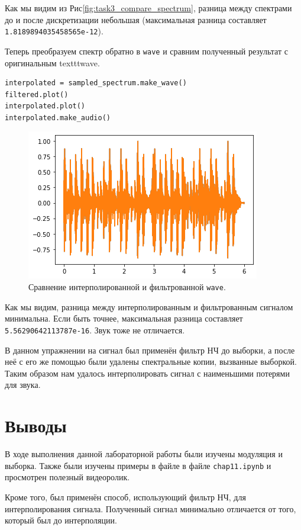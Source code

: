 \documentclass[a4paper, 14pt]{extarticle}
\begin{document}
    Как мы видим из Рис\ref{fig:task3_compare_spectrum}, разница между спектрами до и после дискретизации небольшая
    (максимальная разница составляет \texttt{1.8189894035458565e-12}).

    Теперь преобразуем спектр обратно в \texttt{wave} и сравним полученный результат с оригинальным texttt{wave}.

    \begin{lstlisting}[caption= Сравнение \texttt{wave}., label={lst:task3_compare_wave}]
interpolated = sampled_spectrum.make_wave()
filtered.plot()
interpolated.plot()
interpolated.make_audio()
    \end{lstlisting}

    \begin{figure}[h]
        \centering
        \includegraphics[width=0.8\linewidth]{resources/Images/task3_compare_wave}
        \caption{Сравнение интерполированной и фильтрованной \texttt{wave}.}
        \label{fig:task3_compare_wave}
    \end{figure}

    Как мы видим, разница между интерполированным и фильтрованным сигналом минимальна.
    Если быть точнее, максимальная разница составляет \texttt{5.56290642113787e-16}. Звук тоже не отличается.


    В данном упражнении на сигнал был применён фильтр НЧ до выборки, а после неё с его же помощью были удалены
    спектральные копии, вызванные выборкой. Таким образом нам удалось интерполировать сигнал с наименьшими потерями
    для звука.

    \newpage

    \section{Выводы}
    \label{sec:conclusions}

    В ходе выполнения данной лабораторной работы были изучены модуляция и выборка.
    Также были изучены примеры в файле в файле \texttt{chap11.ipynb} и просмотрен полезный видеоролик.

    Кроме того, был применён способ, использующий фильтр НЧ, для интерполирования сигнала. Полученный сигнал
    минимально отличается от того, который был до интерполяции.
\end{document}

